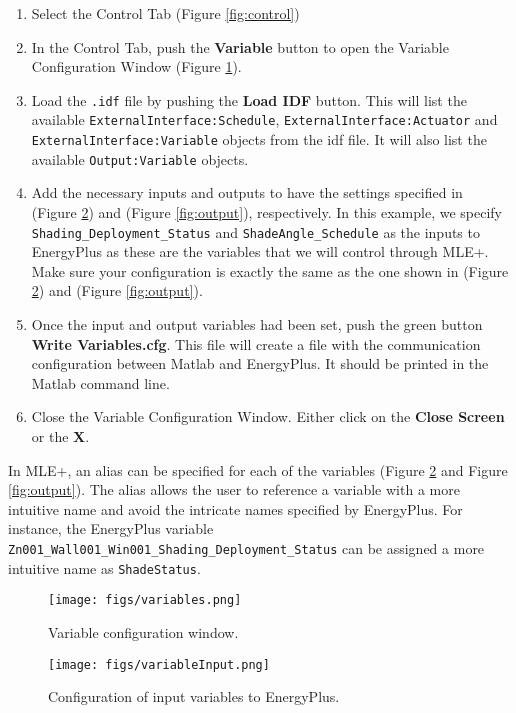 \documentclass[11pt]{article}
\begin{document}
\begin{enumerate}
\item Select the Control Tab (Figure \ref{fig:control})
\item In the Control Tab, push the \textbf{Variable} button to open the Variable
Configuration Window (Figure \ref{fig:variable}).
\item Load the \texttt{.idf} file by pushing the \textbf{Load IDF} button. This
will list the available \texttt{ExternalInterface:Schedule},
\texttt{ExternalInterface:Actuator} and \texttt{ExternalInterface:Variable}
objects from the idf file. It will also list the available
\texttt{Output:Variable} objects.
\item Add the necessary inputs and outputs to have the settings specified
in (Figure \ref{fig:input}) and (Figure \ref{fig:output}),
respectively.  In this example, we specify
\texttt{Shading\_Deployment\_Status} and \texttt{ShadeAngle\_Schedule} as the inputs
to EnergyPlus as these are the variables that we will control
through MLE+. Make sure your configuration is exactly the same as
the one shown in (Figure \ref{fig:input}) and (Figure
\ref{fig:output}).
\item Once the input and output variables had been set, push the green
button \textbf{Write Variables.cfg}. This file will create a file
with the communication configuration between Matlab and
EnergyPlus. It should be printed in the Matlab command line.
\item Close the Variable Configuration Window. Either click on the \textbf{Close Screen}
   or the \textbf{X}.
\end{enumerate}


In MLE+, an alias can be specified for each of the variables (Figure \ref{fig:input} and Figure \ref{fig:output}). 
The alias allows the user to reference a variable with a more intuitive name and avoid the intricate names specified by EnergyPlus.
For instance, the EnergyPlus variable \texttt{Zn001\_Wall001\_Win001\_Shading\_Deployment\_Status} can be assigned a more intuitive name as \texttt{ShadeStatus}.

\begin{figure}[htb]
\centering
\texttt{[image: figs/variables.png]}
\caption{\label{fig:variable}Variable configuration window.}
\end{figure}


\begin{figure}[htb]
\centering
\texttt{[image: figs/variableInput.png]}
\caption{\label{fig:input}Configuration of input variables to EnergyPlus.}
\end{figure}
\end{document}
